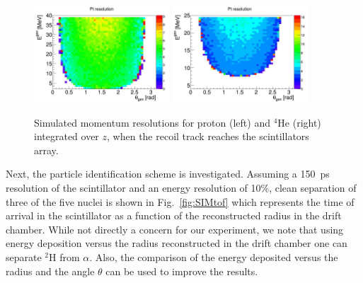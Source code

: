 \begin{figure}[tbp]
    \begin{center}
        \includegraphics[width=0.45\textwidth]{./../Detector/fig-chap2/Bare_3atm_1atm_Proton_ResoPt}%
        \includegraphics[width=0.45\textwidth]{./../Detector/fig-chap2/Bare_3atm_1atm_Alpha_ResoPt}%
        \caption{Simulated momentum resolutions for proton (left) and $^4$He (right) integrated over $z$, when the recoil track reaches the scintillators array.\label{fig:presolution}}
    \end{center}
\end{figure}

Next, the particle identification scheme is investigated. Assuming a 150~ps resolution of the scintillator and an energy resolution of 10\%, clean separation of three of the five nuclei is shown in Fig.~\ref{fig:SIMtof} which represents the time of arrival in the scintillator as a function of the reconstructed radius in the drift chamber. While not directly a concern for our experiment, we note that using energy deposition versus the radius reconstructed in the drift chamber one can separate $^2$H from $\alpha$. Also, the comparison of the energy deposited versus the radius and the angle $\theta$ can be used to improve the results.\\

